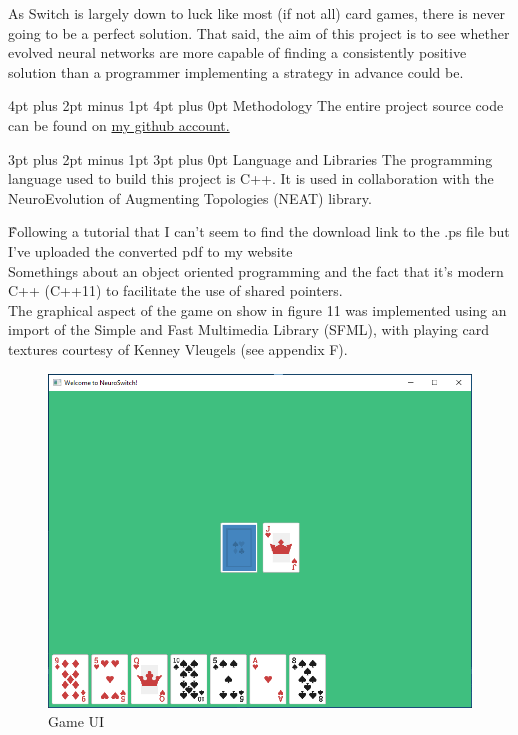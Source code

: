\documentclass[12pt,a4paper]{article}
\makeatletter
\renewcommand\subsection{\@startsection {subsection}{1}{2mm} %
                               {3pt plus 2pt minus 1pt} %
                               {3pt plus 0pt} %
                               {\normalfont\bfseries}}
\renewcommand\section{\@startsection {section}{1}{0mm} %
                               {4pt plus 2pt minus 1pt} %
                               {4pt plus 0pt} %
                               {\bfseries}}
\makeatother
\begin{document}
As Switch is largely down to luck like most (if not all) card games, there is never going to be a perfect solution. That said, the aim of this project is to see whether evolved neural networks are more capable of finding a consistently positive solution than a programmer implementing a strategy in advance could be. 

\newpage
\section{Methodology}
The entire project source code can be found on \href{http://www.github.com/x4iiiis/honoursproject}{my github account.}


\subsection{Language and Libraries}
The programming language used to build this project is C++. It is used in collaboration with the NeuroEvolution of Augmenting Topologies (NEAT) library. 

\^ Following a tutorial that I can't seem to find the download link to the .ps file but I've uploaded the converted pdf to my website\\


Somethings about an object oriented programming and the fact that it's modern C++ (C++11) to facilitate the use of shared pointers. \\

The graphical aspect of the game on show in figure 11 was implemented using an import of the Simple and Fast Multimedia Library (SFML), with playing card textures courtesy of Kenney Vleugels (see appendix F).


\begin{figure}[h]
	\centering
	\includegraphics[width = \textwidth]{SFML.png}
	\caption{Game UI}
\end{figure}
\end{document}
